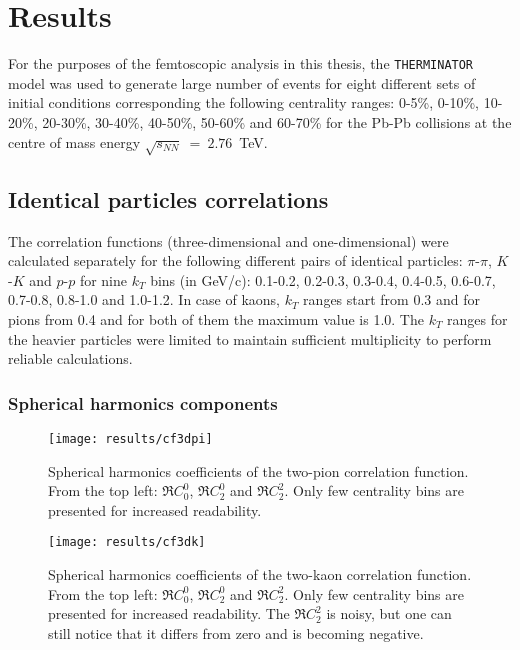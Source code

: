 \chapter{Results}
  For the purposes of the femtoscopic analysis in this thesis, the \verb|THERMINATOR| model was used to generate large number of events for eight different sets of initial conditions corresponding the following centrality ranges: 0-5\%, 0-10\%, 10-20\%, 20-30\%, 30-40\%, 40-50\%, 50-60\% and 60-70\% for the Pb-Pb collisions at the centre of mass energy $\sqrt{s_{NN}}~=~2.76$~TeV.
  \section{Identical particles correlations}
    The correlation functions (three-dimensional and one-dimensional) were calculated separately for the following different pairs of identical particles: $\pi$-$\pi$, $K$-$K$ and  $p$-$p$ for nine $k_T$ bins (in GeV/c): 0.1-0.2, 0.2-0.3, 0.3-0.4, 0.4-0.5, 0.6-0.7, 0.7-0.8, 0.8-1.0 and 1.0-1.2.
    In case of kaons, $k_T$ ranges start from 0.3 and for pions from 0.4 and for both of them the maximum value is 1.0.
    The $k_T$ ranges for the heavier particles were limited to maintain sufficient multiplicity to perform reliable calculations.
    \subsection{Spherical harmonics components}

      \begin{figure}[b]
        \centering
        \centerline{\texttt{[image: results/cf3dpi]}}
        \caption{Spherical harmonics coefficients of the two-pion correlation function. From the top left: $\Re C^0_0$, $\Re C^0_2$ and $\Re C^2_2$. Only few centrality bins are presented for increased readability.}
      \label{fig:cf3dpi}
      \end{figure}

      \begin{figure}[b]
        \centering
        \centerline{\texttt{[image: results/cf3dk]}}
        \caption{Spherical harmonics coefficients of the two-kaon correlation function. From the top left: $\Re C^0_0$, $\Re C^0_2$ and $\Re C^2_2$. Only few centrality bins are presented for increased readability. The $\Re C^2_2$ is noisy, but one can still notice that it differs from zero and is becoming negative.}
      \label{fig:cf3dk}
      \end{figure} 

